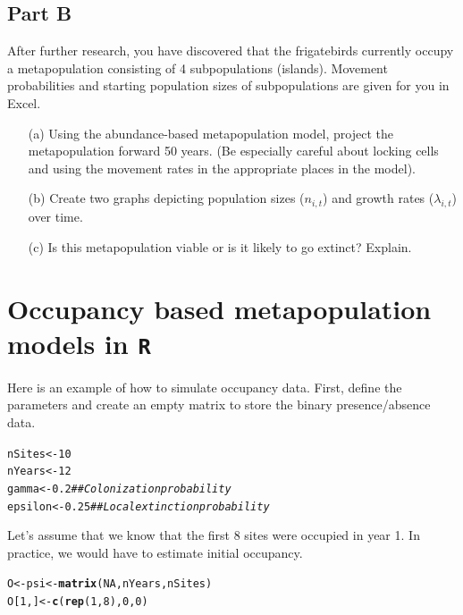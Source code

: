 \documentclass[12pt]{article}\usepackage[]{graphicx}\usepackage[]{color}
\makeatletter
\newcommand{\hlnum}[1]{\textcolor[rgb]{0.686,0.059,0.569}{#1}}%
\newcommand{\hlcom}[1]{\textcolor[rgb]{0.678,0.584,0.686}{\textit{#1}}}%
\newcommand{\hlstd}[1]{\textcolor[rgb]{0.345,0.345,0.345}{#1}}%
\newcommand{\hlkwb}[1]{\textcolor[rgb]{0.69,0.353,0.396}{#1}}%
\newcommand{\hlkwd}[1]{\textcolor[rgb]{0.737,0.353,0.396}{\textbf{#1}}}%
\newenvironment{kframe}{%
 \def\at@end@of@kframe{}%
 \ifinner\ifhmode%
  \def\at@end@of@kframe{\end{minipage}}%
  \begin{minipage}{\columnwidth}%
 \fi\fi%
 \def\FrameCommand##1{\hskip\@totalleftmargin \hskip-\fboxsep
 \colorbox{shadecolor}{##1}\hskip-\fboxsep
     \hskip-\linewidth \hskip-\@totalleftmargin \hskip\columnwidth}%
 \MakeFramed {\advance\hsize-\width
   \@totalleftmargin\z@ \linewidth\hsize
   \@setminipage}}%
 {\par\unskip\endMakeFramed%
 \at@end@of@kframe}
\newenvironment{knitrout}{}{} %
\makeatother
\begin{document}
\subsection*{Part B}
\vspace{-12pt}
After further research, you have discovered that the frigatebirds
currently occupy a metapopulation consisting of 4 subpopulations
(islands). Movement probabilities and starting population sizes of
subpopulations are given for you in Excel.

\begin{enumerate}
  \item[(a)] Using the abundance-based metapopulation model, project
    the metapopulation forward 50 years. (Be especially careful about
    locking cells and using the movement rates in the appropriate
    places in the model).
  \item[(b)] Create two graphs depicting population sizes ($n_{i,t}$)
    and growth rates ($\lambda_{i,t}$) over time.
  \item[(c)] Is this metapopulation viable or is it likely to go
    extinct? Explain.
\end{enumerate}




\clearpage


\section*{Occupancy based metapopulation models in {\tt R} }


Here is an example of how to simulate occupancy data. First, define
the parameters and create an empty matrix to store the binary
presence/absence data.

\begin{knitrout}
\color{fgcolor}\begin{kframe}
\begin{alltt}
\hlstd{nSites} \hlkwb{<-} \hlnum{10}
\hlstd{nYears} \hlkwb{<-} \hlnum{12}
\hlstd{gamma} \hlkwb{<-} \hlnum{0.2}    \hlcom{## Colonization probability}
\hlstd{epsilon} \hlkwb{<-} \hlnum{0.25} \hlcom{## Local extinction probability}
\end{alltt}
\end{kframe}
\end{knitrout}


Let's assume that we know that the first 8 sites were occupied in year
1. In practice, we would have to estimate initial occupancy.
\begin{knitrout}
\color{fgcolor}\begin{kframe}
\begin{alltt}
\hlstd{O} \hlkwb{<-} \hlstd{psi} \hlkwb{<-} \hlkwd{matrix}\hlstd{(}\hlnum{NA}\hlstd{, nYears, nSites)}
\hlstd{O[}\hlnum{1}\hlstd{,]} \hlkwb{<-} \hlkwd{c}\hlstd{(}\hlkwd{rep}\hlstd{(}\hlnum{1}\hlstd{,} \hlnum{8}\hlstd{),} \hlnum{0}\hlstd{,} \hlnum{0}\hlstd{)}
\end{alltt}
\end{kframe}
\end{knitrout}
\end{document}
